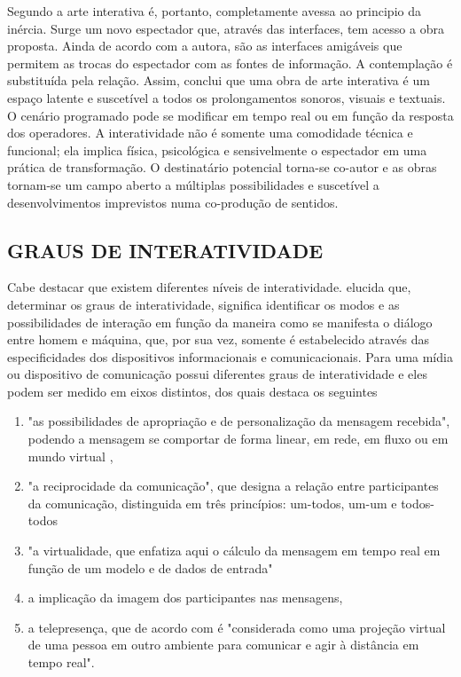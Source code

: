 Segundo  a arte interativa é, portanto, completamente avessa ao principio da inércia. Surge um novo espectador que, através das interfaces, tem acesso a obra proposta. Ainda de acordo com a autora, são as interfaces amigáveis que permitem as trocas do espectador com as fontes de informação. A contemplação é substituída pela relação. Assim,  conclui que uma obra de arte interativa é um espaço latente e suscetível a todos os prolongamentos sonoros, visuais e textuais. O cenário programado pode se modificar em tempo real ou em função da resposta dos operadores. A interatividade não é somente uma comodidade técnica e funcional; ela implica física, psicológica e sensivelmente o espectador em uma prática de transformação. O destinatário potencial torna-se co-autor e as obras tornam-se um campo aberto a múltiplas possibilidades e suscetível a desenvolvimentos imprevistos numa co-produção de sentidos.	

\subsection{GRAUS DE INTERATIVIDADE}

Cabe destacar que existem diferentes níveis de interatividade.  elucida que, determinar os graus de interatividade, significa identificar os modos e as possibilidades de interação em função da maneira como se manifesta o diálogo entre homem e máquina, que, por sua vez, somente é estabelecido através das especificidades dos dispositivos informacionais e comunicacionais. Para  uma mídia ou dispositivo de comunicação possui diferentes graus de interatividade e eles podem ser medido em eixos distintos, dos quais destaca os seguintes

\begin{enumerate}
\item "as possibilidades de apropriação e de personalização da mensagem recebida", podendo a mensagem se comportar de forma linear, em rede, em fluxo ou em mundo virtual \cite[p. 82]{levy},
\item "a reciprocidade da comunicação", que designa a relação entre participantes da comunicação, distinguida em três princípios: um-todos, um-um e todos-todos
\item "a virtualidade, que enfatiza aqui o cálculo da mensagem em tempo real em função de um modelo e de dados de entrada"
\item a implicação da imagem dos participantes nas mensagens, 
\item a telepresença, que de acordo com  é "considerada como uma projeção virtual de uma pessoa em outro ambiente para comunicar e agir à distância em tempo real".
\end{enumerate}

